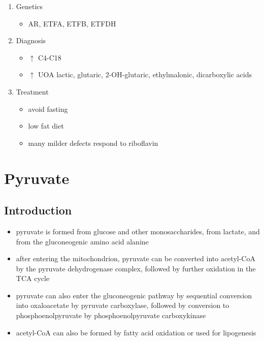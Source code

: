 \documentclass{scrartcl}
\begin{document}
\begin{enumerate}
\begin{enumerate}
\item Genetics
\label{sec:org63baae6}
\begin{itemize}
\item AR, ETFA, ETFB, ETFDH
\end{itemize}

\item Diagnosis
\label{sec:org8f67210}
\begin{itemize}
\item \(\uparrow\) C4-C18
\item \(\uparrow\) UOA lactic, glutaric, 2-OH-glutaric, ethylmalonic, dicarboxylic acids
\end{itemize}
\item Treatment
\label{sec:orgf6274fc}
\begin{itemize}
\item avoid fasting
\item low fat diet
\item many milder defects respond to riboflavin
\end{itemize}
\end{enumerate}
\end{enumerate}
\section{Pyruvate}
\label{sec:org379857d}
\subsection{Introduction}
\label{sec:orge42d50c}
\begin{itemize}
\item pyruvate is formed from glucose and other monosaccharides, from
lactate, and from the gluconeogenic amino acid alanine
\item after entering the mitochondrion, pyruvate can be converted into
acetyl-CoA by the pyruvate dehydrogenase complex, followed by
further oxidation in the TCA cycle
\item pyruvate can also enter the gluconeogenic pathway by sequential
conversion into oxaloacetate by pyruvate carboxylase, followed by
conversion to phosphoenolpyruvate by phosphoenolpyruvate
carboxykinase
\item acetyl-CoA can also be formed by fatty acid oxidation or used for
lipogenesis
\end{itemize}
\end{document}
